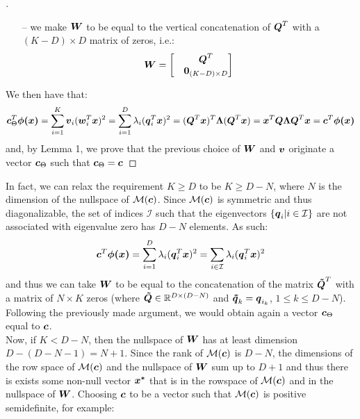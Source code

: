 \documentclass{exam}
\begin{document}
\begin{questions}
\begin{proof}[\unskip\nopunct]
\begin{itemize}
            \item[--] we make $\vb*{W}$ to be equal to the vertical concatenation of $\vb*{Q}^T$ with a $(K - D) \times D$ matrix of zeros, i.e.:
            \begin{align*}
            \vb*{W} = 
                \begin{bmatrix}
                    &\vb*{Q}^T \\
                    &\vb*{0}_{(K - D) \times D}
                \end{bmatrix}
            \end{align*}
        \end{itemize}
        We then have that:
        \[
            \vb*{c}^T_{\Theta} \vb*{\phi(x)} = \sum_{i = 1}^{K} \vb*{v}_i (\vb*{w}_i^T\vb*{x})^2 =  \sum_{i = 1}^{D} \lambda_i (\vb*{q}_i^T\vb*{x})^2 = (\vb*{Q}^T \vb*{x})^T \vb*{\Lambda} (\vb*{Q}^T \vb*{x}) = \vb*{x}^T \vb*{Q} \vb*{\Lambda}\vb*{Q}^T \vb*{x} = \vb*{c}^T \vb*{\phi(x)}
        \]
        and, by Lemma 1, we prove that the previous choice of $\vb*{W}$ and $\vb*{v}$ originate a vector $\vb*{c}_{\Theta}$ such that $\vb*{c}_{\Theta} = \vb*{c}$
        \end{proof}
        In fact, we can relax the requirement $K \ge D$ to be $K \ge D - N$, where $N$ is the dimension of the nullspace of $\mathcal{M}(\vb*{c})$. Since $\mathcal{M}(\vb*{c})$ is symmetric and thus diagonalizable, the set of indices $\mathcal{I}$ such that the eigenvectors $\{\vb*{q}_i | i \in \mathcal{I}\}$ are not associated with eigenvalue zero has $D - N$ elements. As such:
        \[
            \vb*{c}^T \vb*{\phi(x)} = \sum_{i = 1}^{D} \lambda_i (\vb*{q}_i^T\vb*{x})^2 = \sum_{i \in \mathcal{I}} \lambda_i (\vb*{q}_i^T\vb*{x})^2
        \]
        and thus we can take $\vb*{W}$ to be equal to the concatenation of the matrix $\vb*{\tilde{Q}}^T$ with a matrix of $N \times K$ zeros (where $\vb*{\tilde{Q}} \in \mathbb{R}^{D \times (D - N)}$ and $\vb*{\tilde{q}}_k = \vb*{q}_{i_k}$, $1 \le k \le D - N$). Following the previously made argument, we would obtain again a vector $\vb*{c}_{\Theta}$ equal to $\vb*{c}$. \\
        Now, if $K < D - N$, then the nullspace of $\vb*{W}$ has at least dimension $D - (D - N - 1) = N + 1$. Since the rank of $\mathcal{M}(\vb*{c})$ is $D - N$, the dimensions of the row space of $\mathcal{M}(\vb*{c})$ and the nullspace of $\vb*{W}$ sum up to $D + 1$ and thus there is exists some non-null vector $\vb*{x^*}$ that is in the rowspace of $\mathcal{M}(\vb*{c})$ and in the nullspace of $\vb*{W}$. Choosing $\vb*{c}$ to be a vector such that $\mathcal{M}(\vb*{c})$ is positive semidefinite, for example: 

\end{questions}
\end{document}
